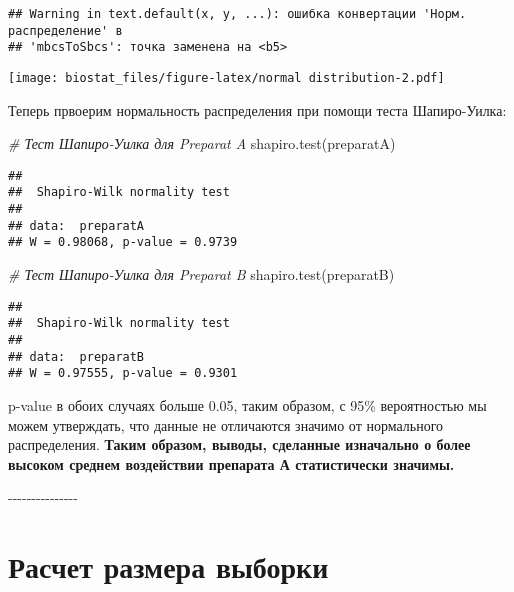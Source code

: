 \documentclass[
]{article}
\newenvironment{Shaded}{\begin{snugshade}}{\end{snugshade}}
\newcommand{\CommentTok}[1]{\textcolor[rgb]{0.56,0.35,0.01}{\textit{#1}}}
\newcommand{\FunctionTok}[1]{\textcolor[rgb]{0.00,0.00,0.00}{#1}}
\newcommand{\NormalTok}[1]{#1}
\begin{document}
\begin{verbatim}
## Warning in text.default(x, y, ...): ошибка конвертации 'Норм. распределение' в
## 'mbcsToSbcs': точка заменена на <b5>
\end{verbatim}

\texttt{[image: biostat\_files/figure-latex/normal distribution-2.pdf]}

Теперь првоерим нормальность распределения при помощи теста
Шапиро-Уилка:

\begin{Shaded}
\begin{Highlighting}[]
\CommentTok{\# Тест Шапиро{-}Уилка для Preparat A}
\FunctionTok{shapiro.test}\NormalTok{(preparatA)}
\end{Highlighting}
\end{Shaded}

\begin{verbatim}
## 
##  Shapiro-Wilk normality test
## 
## data:  preparatA
## W = 0.98068, p-value = 0.9739
\end{verbatim}

\begin{Shaded}
\begin{Highlighting}[]
\CommentTok{\# Тест Шапиро{-}Уилка для Preparat B}
\FunctionTok{shapiro.test}\NormalTok{(preparatB)}
\end{Highlighting}
\end{Shaded}

\begin{verbatim}
## 
##  Shapiro-Wilk normality test
## 
## data:  preparatB
## W = 0.97555, p-value = 0.9301
\end{verbatim}

p-value в обоих случаях больше 0.05, таким образом, с 95\% вероятностью
мы можем утверждать, что данные не отличаются значимо от нормального
распределения. \textbf{Таким образом, выводы, сделанные изначально о
более высоком среднем воздействии препарата А статистически значимы.}

-\/-\/-\/-\/-\/-\/-\/-\/-\/-\/-\/-\/-\/-\/-

\hypertarget{ux440ux430ux441ux447ux435ux442-ux440ux430ux437ux43cux435ux440ux430-ux432ux44bux431ux43eux440ux43aux438}{%
\section{Расчет размера
выборки}\label{ux440ux430ux441ux447ux435ux442-ux440ux430ux437ux43cux435ux440ux430-ux432ux44bux431ux43eux440ux43aux438}}
\end{document}
